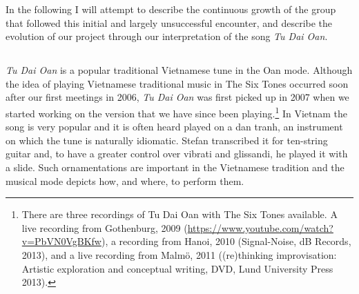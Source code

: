 \documentclass[a4paper]{article}
\begin{document}
In the following I will attempt to describe the continuous growth of the group that followed this initial and largely unsuccessful encounter, and describe the evolution of our project through our interpretation of the song \emph{Tu Dai Oan}.



\subsection*{ }
\label{sec:tu-ddai-oan}


\emph{Tu Dai Oan} is a popular traditional Vietnamese tune in the Oan mode. Although the idea of playing Vietnamese traditional music in The Six Tones occurred soon after our first meetings in 2006, \emph{Tu Dai Oan} was first picked up in 2007 when we started working on the version that we have since been playing.\footnote{There are three recordings of Tu Dai Oan with The Six Tones available. A live recording from Gothenburg, 2009 (\url{https://www.youtube.com/watch?v=PbVN0VgBKfw}), a recording from Hanoi, 2010 (Signal-Noise, dB Records, 2013), and a live recording from Malmö, 2011 ((re)thinking improvisation: Artistic exploration and conceptual writing, DVD, Lund University Press 2013).} In Vietnam the song is very popular and it is often heard played on a dan tranh, an instrument on which the tune is naturally idiomatic. Stefan transcribed it for ten-string guitar and, to have a greater control over vibrati and glissandi, he played it with a slide. Such ornamentations are important in the Vietnamese tradition and the musical mode depicts how, and where, to perform them.
\end{document}
